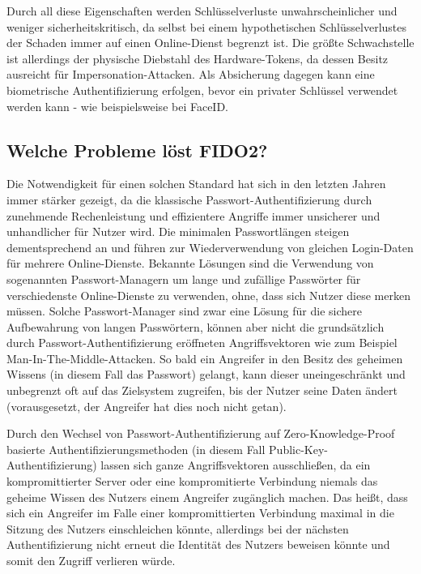 \documentclass[journal]{IEEEtran}
\begin{document}
Durch all diese Eigenschaften werden Schlüsselverluste unwahrscheinlicher und
weniger sicherheitskritisch, da selbst bei einem hypothetischen
Schlüsselverlustes der Schaden immer auf einen Online-Dienst begrenzt ist. Die
größte Schwachstelle ist allerdings der physische Diebstahl des
Hardware-Tokens, da dessen Besitz ausreicht für Impersonation-Attacken. Als
Absicherung dagegen kann eine biometrische Authentifizierung erfolgen, bevor
ein privater Schlüssel verwendet werden kann - wie beispielsweise bei FaceID.\

\subsection{Welche Probleme löst FIDO2?}

Die Notwendigkeit für einen solchen Standard hat sich in den letzten Jahren
immer stärker gezeigt, da die klassische Passwort-Authentifizierung durch
zunehmende Rechenleistung und effizientere Angriffe immer unsicherer und
unhandlicher für Nutzer wird. Die minimalen Passwortlängen steigen
dementsprechend an und führen zur Wiederverwendung von gleichen Login-Daten für
mehrere Online-Dienste. Bekannte Lösungen sind die Verwendung von sogenannten
Passwort-Managern um lange und zufällige Passwörter für verschiedenste
Online-Dienste zu verwenden, ohne, dass sich Nutzer diese merken müssen. Solche
Passwort-Manager sind zwar eine Lösung für die sichere Aufbewahrung von langen
Passwörtern, können aber nicht die grundsätzlich durch
Passwort-Authentifizierung eröffneten Angriffsvektoren wie zum Beispiel
Man-In-The-Middle-Attacken. So bald ein Angreifer in den Besitz des geheimen
Wissens (in diesem Fall das Passwort) gelangt, kann dieser uneingeschränkt und
unbegrenzt oft auf das Zielsystem zugreifen, bis der Nutzer seine Daten
ändert (vorausgesetzt, der Angreifer hat dies noch nicht getan).

Durch den Wechsel von Passwort-Authentifizierung auf Zero-Knowledge-Proof
basierte Authentifizierungsmethoden (in diesem Fall
Public-Key-Authentifizierung) lassen sich ganze Angriffsvektoren ausschließen,
da ein kompromittierter Server oder eine kompromitierte Verbindung niemals das
geheime Wissen des Nutzers einem Angreifer zugänglich machen. Das heißt, dass
sich ein Angreifer im Falle einer kompromittierten Verbindung maximal in die
Sitzung des Nutzers einschleichen könnte, allerdings bei der nächsten
Authentifizierung nicht erneut die Identität des Nutzers beweisen könnte und
somit den Zugriff verlieren würde.
\end{document}
